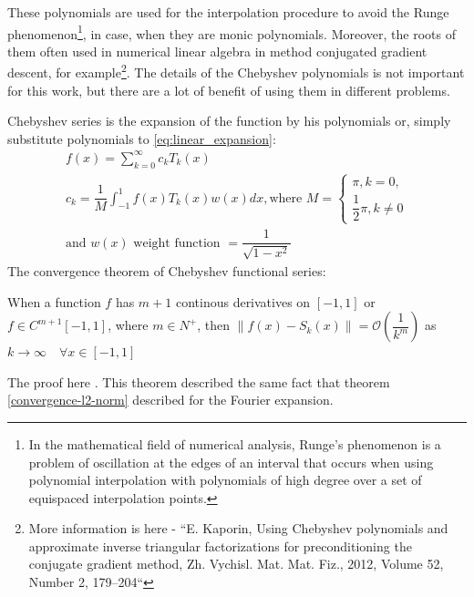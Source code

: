 These polynomials are used for the interpolation procedure to avoid the Runge phenomenon\footnote{In the mathematical field of numerical analysis, Runge's phenomenon is a problem of oscillation at the edges of an interval that occurs when using polynomial interpolation with polynomials of high degree over a set of equispaced interpolation points.}, in case, when they are monic polynomials. Moreover, the roots of them often used in numerical linear algebra in method conjugated gradient descent, for example\footnote{
More information is here - ``E. Kaporin, Using Chebyshev polynomials and approximate inverse triangular
factorizations for preconditioning the conjugate gradient method, Zh. Vychisl. Mat.
Mat. Fiz., 2012, Volume 52, Number 2, 179–204``}.
The details of the Chebyshev polynomials is not important for this work, but there are a lot of benefit of using them in different problems.

Chebyshev series is the expansion of the function by his polynomials or, simply substitute polynomials to \eqref{eq:linear_expansion}:
\begin{equation*}
	\begin{multlined}
		f(x) = \sum_{k = 0}^{\infty} c_k T_k(x) \\
		c_k = \dfrac{1}{M} \int_{-1}^1 f(x) T_k(x) w(x) dx, \text{where } M = \begin{cases}
		\pi, k = 0, \\
		\dfrac{1}{2} \pi, k \neq 0
	\end{cases} \\
	\text{and } w(x) \text{ weight function } = \dfrac{1}{\sqrt{1 - x^2}}
	\end{multlined}
\end{equation*}
The convergence theorem of Chebyshev functional series:
\begin{theorem}
\label{chevyshev_convergence}
When a function $f$ has $m + 1$ continous derivatives on $[-1, 1]$ or $ f \in C^{m + 1}[-1, 1] $, where $m \in N^+$, then $\| f(x) - S_k(x) \| = \mathcal{O}\left ( \dfrac{1}{k^m} \right )$ as $k \rightarrow \infty \quad \forall x \in [-1, 1]$ 
\end{theorem}
The proof here \cite{mason2002chebyshev}.
This theorem described the same fact that theorem \ref{convergence-l2-norm}  described for the Fourier expansion.

